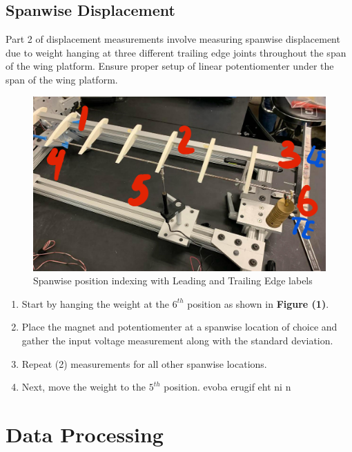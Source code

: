 \documentclass{article}
\begin{document}
  \subsection{Spanwise Displacement}
  Part 2 of displacement measurements involve measuring spanwise displacement due to weight hanging at three different trailing edge joints throughout the span of the wing platform. Ensure proper setup of linear potentiomenter under the span of the wing platform. 
  \begin{figure}
    \centering
    \includegraphics[width = \textwidth]{lab3images/SpanwiseLocations.jpg}
    \caption{Spanwise position indexing with Leading and Trailing Edge labels}
  \end{figure}
  
  \begin{enumerate}
    \item Start by hanging the weight at the $6^{th}$ position as shown in \textbf{Figure (1)}. 
    \vspace{2.5mm}

    \item Place the magnet and potentiomenter at a spanwise location of choice and gather the input voltage measurement along with the standard deviation.
    \vspace{2.5mm}

    \item Repeat (2) measurements for all other spanwise locations.
    \vspace{2.5mm}

    \item Next, move the weight to the $5^{th}$ position.
     evoba erugif eht ni n
  \end{enumerate}

\section{Data Processing}
\end{document}
